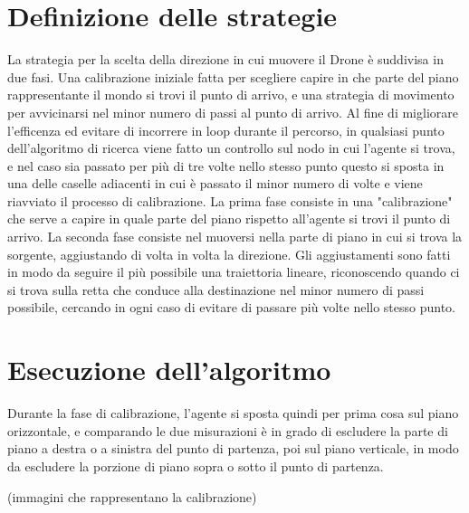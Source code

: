 \section{Definizione delle strategie}
La strategia per la scelta della direzione in cui muovere il Drone è suddivisa in due fasi. Una calibrazione iniziale fatta per scegliere capire in che parte del piano rappresentante il mondo si trovi il punto di arrivo, e una strategia di movimento per avvicinarsi nel minor numero di passi al punto di arrivo. Al fine di migliorare l'efficenza ed evitare di incorrere in loop durante il percorso, in qualsiasi punto dell'algoritmo di ricerca viene fatto un controllo sul nodo in cui l'agente si trova, e nel caso sia passato per più di tre volte nello stesso punto questo si sposta in una delle caselle adiacenti in cui è passato il minor numero di volte e viene riavviato il processo di calibrazione.
La prima fase consiste in una "calibrazione" che serve a capire in quale parte del piano rispetto all'agente si trovi il punto di arrivo. 
La seconda fase consiste nel muoversi nella parte di piano in cui si trova la sorgente, aggiustando di volta in volta la direzione. Gli aggiustamenti sono fatti in modo da seguire il più possibile una traiettoria lineare, riconoscendo quando ci si trova sulla retta che conduce alla destinazione nel minor numero di passi possibile, cercando in ogni caso di evitare di passare più volte nello stesso punto.
	
\section{Esecuzione dell'algoritmo}
Durante la fase di calibrazione, l'agente si sposta quindi per prima cosa sul piano orizzontale, e comparando le due misurazioni è in grado di escludere la parte di piano a destra o a sinistra del punto di partenza, poi sul piano verticale, in modo da escludere la porzione di piano sopra o sotto il punto di partenza. 

(immagini che rappresentano la calibrazione)

